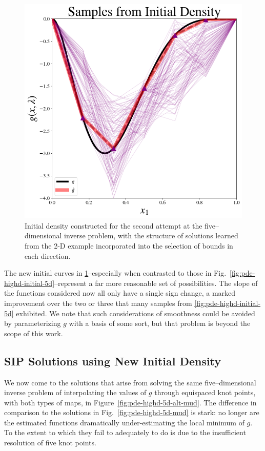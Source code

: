 \begin{figure}
\centering
  \includegraphics[width=0.675\linewidth]{figures/pde-highd/pde-highd_init_D5-alt}
\caption{
Initial density constructed for the second attempt at the five--dimensional inverse problem, with the structure of solutions learned from the 2-D example incorporated into the selection of bounds in each direction.
}
\label{fig:pde-highd-alt-initial-5d}
\end{figure}

The new initial curves in \ref{fig:pde-highd-alt-initial-5d}\---especially when contrasted to those in Fig.~\ref{fig:pde-highd-initial-5d}\---represent a far more reasonable set of possibilities.
The slope of the functions considered now all only have a single sign change, a marked improvement over the two or three that many samples from \ref{fig:pde-highd-initial-5d} exhibited.
We note that such considerations of smoothness could be avoided by parameterizing $g$ with a basis of some sort, but that problem is beyond the scope of this work.

\subsection{SIP Solutions using New Initial Density}
We now come to the solutions that arise from solving the same five--dimensional inverse problem of interpolating the values of $g$ through equispaced knot points, with both types of maps, in Figure~\ref{fig:pde-highd-5d-alt-mud}.
The difference in comparison to the solutions in Fig.~\ref{fig:pde-highd-5d-mud} is stark: no longer are the estimated functions dramatically under-estimating the local minimum of $g$.
To the extent to which they fail to adequately to do is due to the insufficient resolution of five knot points.

